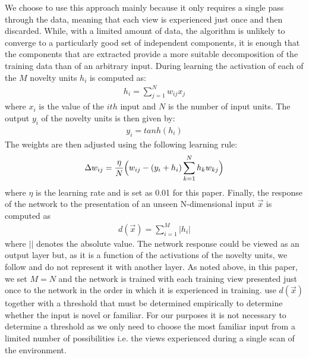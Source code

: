 \documentclass[letterpaper]{article}
\begin{document}
We choose to use this approach mainly because it only requires a single pass through the data, meaning that each view is experienced just once and then discarded. 
While, with a limited amount of data, the algorithm is unlikely to converge to a particularly good set of independent components, it is enough that the components that are extracted provide a more suitable decomposition of the training data than of an arbitrary input.
During learning the activation of each of the $M$ novelty units $h_{i}$ is computed as:
%
\begin{align}
    h_{i}=\sum\limits_{j=1}^N w_{ij}x_{j}   \label{eqn:infomax_activation}
\end{align}
%
where $x_{i}$ is the value of the $ith$ input and $N$ is the number of input units. 
The output $y_{i}$ of the novelty units is then given by:
%
\begin{align}
    y_{i}=tanh(h_{i})   \label{eqn:infomax_output}
\end{align}
%
The weights are then adjusted using the following learning rule: 
%
\begin{align}
    \Delta w_{ij}=\frac{\eta}{N} \Bigl( w_{ij} - (y_{i} + h_{i}) \sum\limits_{k=1}^N h_{k}w_{kj} \Bigr)   \label{eqn:infomax_learning}
\end{align}
%
where $\eta$ is the learning rate and is set as \num{0.01} for this paper. 
Finally, the response of the network to the presentation of an unseen N-dimensional input $\vec{x}$ is computed as
%
\begin{align}
    d(\vec{x})=\sum\limits_{i=1}^M |h_{i}|     \label{eqn:infomax_response}
\end{align}
%
where $||$ denotes the absolute value. 
The network response could be viewed as an output layer but, as it is a function of the activations of the novelty units, we follow \citet{Lulham2011} and do not represent it with another layer. 
As noted above, in this paper, we set $M=N$ and the network is trained with each training view presented just once to the network in the order in which it is experienced in training. 
\citet{Lulham2011} use $d(\vec{x})$ together with a threshold that must be determined empirically to determine whether the input is novel or familiar. 
For our purposes it is not necessary to determine a threshold as we only need to choose the most familiar input from a limited number of possibilities i.e. the views experienced during a single scan of the environment.
\end{document}
